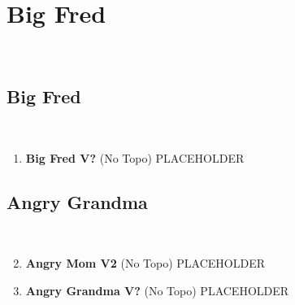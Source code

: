 \section{Big Fred}\label{sa:Big Fred}
\
\subsection*{Big Fred}\label{bf:Big Fred}
\

\begin{enumerate}[]
	\setcounter{enumi}{0}
	\item\label{rt:Big Fred} \colorbox{black!20}{\textbf{Big Fred V?  } }
	\newline (No Topo) 
	\newline PLACEHOLDER\
\end{enumerate}
\subsection*{Angry Grandma}\label{bf:Angry Grandma}
\

\begin{enumerate}[]
	\setcounter{enumi}{1}
	\item\label{rt:Angry Mom} \colorbox{green!20}{\textbf{Angry Mom V2  } }
	\newline (No Topo) 
	\newline PLACEHOLDER\
	\setcounter{enumi}{2}
	\item\label{rt:Angry Grandma} \colorbox{black!20}{\textbf{Angry Grandma V?  } }
	\newline (No Topo) 
	\newline PLACEHOLDER\
\end{enumerate}
\clearpage